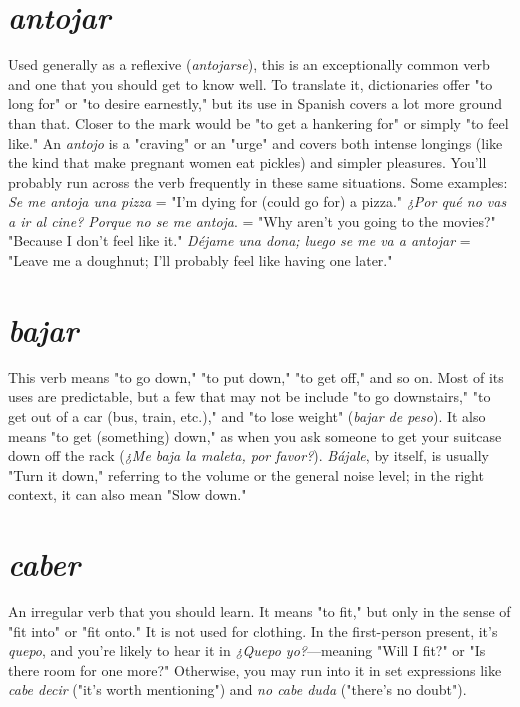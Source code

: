 \documentclass[14pt,a4paper,oneside]{memoir}
\begin{document}
\section{\emph{antojar}}

Used generally as a reflexive (\emph{antojarse}), this is an exceptionally common verb and one that you should get to know well. To translate it, dictionaries offer "to long for" or "to desire earnestly," but its
use in Spanish covers a lot more ground than that. Closer to the mark
would be "to get a hankering for" or simply "to feel like." An \emph{antojo}
is a "craving" or an "urge" and covers both intense longings (like the
kind that make pregnant women eat pickles) and simpler pleasures.
You'll probably run across the verb frequently in these same situations. Some examples: \emph{Se me antoja una pizza} = "I'm dying for (could
go for) a pizza." \emph{¿Por qué no vas a ir al cine? Porque no se me antoja}.
= "Why aren't you going to the movies?" "Because I don't feel like it."
\emph{Déjame una dona; luego se me va a antojar} = "Leave me a doughnut;
I'll probably feel like having one later."

\section{\emph{bajar}}

This verb means "to go down," "to put down," "to get off,"
and so on. Most of its uses are predictable, but a few that may not be
include "to go downstairs," "to get out of a car (bus, train, etc.)," and
"to lose weight" (\emph{bajar de peso}). It also means "to get (something)
down," as when you ask someone to get your suitcase down off the
rack (\emph{¿Me baja la maleta, por favor?}). \emph{Bájale}, by itself, is usually "Turn
it down," referring to the volume or the general noise level; in the
right context, it can also mean "Slow down."

\section{\emph{caber}}

An irregular verb that you should learn. It means "to fit," but
only in the sense of "fit into" or "fit onto." It is not used for clothing.
In the first-person present, it's \emph{quepo}, and you're likely to hear it in
\emph{¿Quepo yo?}---meaning "Will I fit?" or "Is there room for one more?"
Otherwise, you may run into it in set expressions like \emph{cabe decir} ("it's
worth mentioning") and \emph{no cabe duda} ("there's no doubt").
\end{document}
